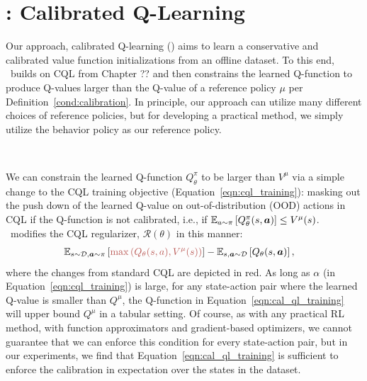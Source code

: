 \vspace{-0.1cm}
\section{\methodname: Calibrated Q-Learning}
\label{sec:empirical-method}
\vspace{-0.25cm}
Our approach, calibrated Q-learning (\methodname) aims to learn a conservative and calibrated value function initializations from an offline dataset. To this end, \methodname\ builds on CQL from Chapter ?? and then constrains the learned Q-function to produce Q-values larger than the Q-value of a reference policy $\mu$ per Definition~\ref{cond:calibration}. In principle, our approach can utilize many different choices of reference policies, but for developing a practical method, we simply utilize the behavior policy as our reference policy.  

~

 We can constrain the learned Q-function $Q^\pi_\theta$ to be larger than $V^\mu$ via a simple change to the CQL training objective (Equation~\ref{eqn:cql_training}): masking out the push down of the learned Q-value on out-of-distribution (OOD) actions in CQL if the Q-function is not calibrated, i.e., if $\mathbb{E}_{a \sim \pi}\left[Q^\pi_\theta(s, \boldsymbol{a})\right] \leq V^\mu(s)$. \methodname\ modifies the CQL regularizer, $\mathcal{R}(\theta)$ in this manner: 
\begin{align}
\label{eqn:cal_ql_training}
\!\!\!\!\!\!\mathbb{E}_{\bs \sim \mathcal{D}, \mathbf{a} \sim \pi} \brac{{\color[HTML]{B85450}{\max \left( Q_\theta(s,a), V^\mu(s) \right)}} } - \mathbb{E}_{\bs, \mathbf{a} \sim \mathcal{D}}\left[Q_\theta(\bs,\mathbf{a})\right],
\end{align}
where the changes from standard CQL are depicted in {\color[HTML]{B85450} red}. As long as $\alpha$ (in Equation~\ref{eqn:cql_training}) is large, for any state-action pair where the learned Q-value is smaller than $Q^\mu$, the Q-function in Equation~\ref{eqn:cal_ql_training} will upper bound $Q^\mu$ in a tabular setting. Of course, as with any practical RL method, with function approximators and gradient-based optimizers, we cannot guarantee that we can enforce this condition for every state-action pair, but in our experiments, we find that Equation~\ref{eqn:cal_ql_training} is sufficient to enforce the calibration in expectation over the states in the dataset.         

